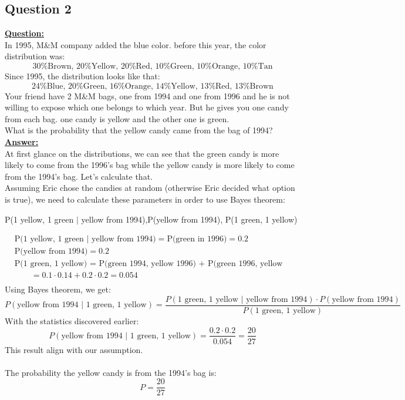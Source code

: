 \documentclass[a4, 12pt,titlepage]{scrartcl}
\begin{document}
\subsection{Question 2}
\textbf{\underline{Question:}}\\
In 1995, M\&M company added the blue color. before this year, the color distribution was:\[
\textrm{30\% Brown, 20\% Yellow, 20\% Red, 10\% Green, 10\% Orange, 10\% Tan}
\]
Since 1995, the distribution looks like that:\[
\textrm{24\% Blue, 20\% Green, 16\% Orange, 14\% Yellow, 13\% Red, 13\% Brown}
\]
Your friend have 2 M\&M bags, one from 1994 and one from 1996 and he is not willing to expose which one belongs to which year. But he gives you one candy from each bag. one candy is yellow and the other one is green.\\
What is the probability that the yellow candy came from the bag of 1994?\\

\textbf{\underline{Answer:}}\\
At first glance on the distributions, we can see that the green candy is more likely to come from the 1996's bag while the yellow candy is more likely to come from the 1994's bag. Let's calculate that.\\

Assuming Eric chose the candies at random (otherwise Eric decided what option is true), we need to calculate these parameters in order to use Bayes theorem:
\begin{center}
\quad P(1 yellow, 1 green $|$ yellow from 1994),\quad P(yellow from 1994), \quad P(1 green, 1 yellow)
\end{center}\smallskip
\begin{align*}
&\textrm{P(1 yellow, 1 green $|$ yellow from 1994)}=\textrm{P(green in 1996)}=0.2\\
&\textrm{P(yellow from 1994)}=0.2\\
&\textrm{P(1 green, 1 yellow) = P(green 1994, yellow 1996) + P(green 1996, yellow 1994)}\\
&\qquad=0.1\cdot 0.14+0.2\cdot 0.2=0.054\\
\end{align*}Using Bayes theorem, we get:\[
P(\textrm{yellow from 1994 $|$ 1 green, 1 yellow})=\frac{P(\textrm{1 green, 1 yellow $|$ yellow from 1994})\cdot P(\textrm{yellow from 1994})}{P(\textrm{1 green, 1 yellow})}
\]
With the statistics discovered earlier:\[
P(\textrm{yellow from 1994 $|$ 1 green, 1 yellow})=\frac{0.2\cdot 0.2}{0.054}=\frac{20}{27}
\]
This result align with our assumption.\\\smallskip\\
The probability the yellow candy is from the 1994's bag is:
\[
\boxed{P=\frac{20}{27}}
\]
\newpage
\end{document}
